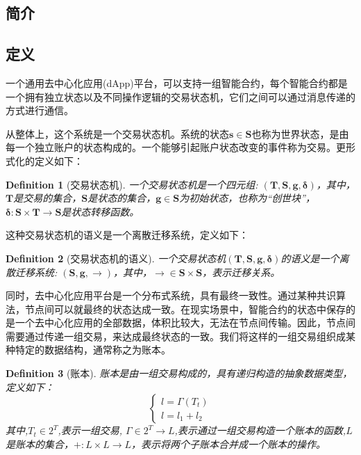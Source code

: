 \documentclass[UTF8,nofonts]{ctexart}
\newtheorem{definition}{Definition}[section]
\begin{document}
\begin{multicols}{2}

\section{简介}
\subsection{定义}

一个通用去中心化应用(dApp)平台，可以支持一组智能合约，每个智能合约都是一个拥有独立状态以及不同操作逻辑的交易状态机，它们之间可以通过消息传递的方式进行通信。

从整体上，这个系统是一个交易状态机。系统的状态$\boldsymbol{s}\in\boldsymbol{S}$也称为世界状态，是由每一个独立账户的状态构成的。一个能够引起账户状态改变的事件称为交易。更形式化的定义如下：

\begin{definition}[交易状态机] \label{def:fsm}
一个交易状态机是一个四元组: $(\boldsymbol{T},\boldsymbol{S},\boldsymbol{g},\boldsymbol{{\delta}})$，其中，$\boldsymbol{T}$是交易的集合，$\boldsymbol{S}$是状态的集合，$\boldsymbol{g} \in \boldsymbol{S}$为初始状态，也称为“创世块”，$\boldsymbol{{\delta}:\boldsymbol{S}\times\boldsymbol{T}\rightarrow\boldsymbol{S}}$是状态转移函数。
\end{definition}

这种交易状态机的语义是一个离散迁移系统，定义如下：
\begin{definition}[交易状态机的语义] \label{def:semantics}
一个交易状态机$(\boldsymbol{T},\boldsymbol{S},\boldsymbol{g},\boldsymbol{{\delta}})$的语义是一个离散迁移系统: $(\boldsymbol{S},\boldsymbol{g},\boldsymbol{\rightarrow})$，其中，$\boldsymbol{\rightarrow} \in \boldsymbol{S}\times\boldsymbol{S}$，表示迁移关系。
\end{definition}

同时，去中心化应用平台是一个分布式系统，具有最终一致性。通过某种共识算法，节点间可以就最终的状态达成一致。在现实场景中，智能合约的状态中保存的是一个去中心化应用的全部数据，体积比较大，无法在节点间传输。因此，节点间需要通过传递一组交易，来达成最终状态的一致。我们将这样的一组交易组织成某种特定的数据结构，通常称之为账本。

\begin{definition}[账本] \label{def:ledger}
账本是由一组交易构成的，具有递归构造的抽象数据类型，定义如下：
$$
\left\{\begin{matrix}
l = \Gamma(T_{t})\\ 
l = l_{1} + l_{2}
\end{matrix}\right.
$$
其中,$T_{t} \in 2^{T}$,表示一组交易, $\Gamma \in 2^{T} \rightarrow L$,表示通过一组交易构造一个账本的函数,$L$是账本的集合，$\boldsymbol{+}: L \times L \rightarrow L$，表示将两个子账本合并成一个账本的操作。
\end{definition}


\end{multicols}
\end{document}
